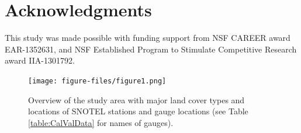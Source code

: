 \documentclass[11pt,letterpaper]{article}
\begin{document}
\section*{Acknowledgments}
This study was made possible with funding support from NSF CAREER award EAR-1352631, and NSF Established Program to Stimulate Competitive Research award IIA-1301792.


\renewcommand\bibname{References}










\clearpage

\begin{figure}
\centering
\texttt{[image: figure-files/figure1.png]}
\caption{Overview of the study area with major land cover types and locations of SNOTEL stations and gauge locations (see Table \ref{table:CalValData} for names of gauges).}
\label{fig:StudySite}
\end{figure}
\clearpage
\end{document}
